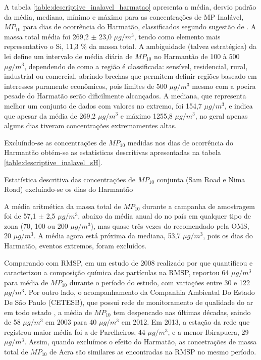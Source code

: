 A tabela \ref{table:descriptive_inalavel_harmatao} apresenta a média, 
desvio padrão da média, mediana, mínimo e máximo para as concentrações de 
MP Inalável, $MP_{10}$ para dias de ocorrência do Harmatão, classificados
segundo sugestão de \citet{aboh2009}. A massa total média foi 269,2 $\pm$ 23,0
$\mu g/ m^3$, tendo como elemento mais representativo o Si, 11,3 \% da massa total. 
A ambiguidade (talvez estratégica) da lei define um intervalo de média diária 
de $MP_{10}$ no Harmantão de 100 à 500 $\mu g/ m^3$, dependendo de como a região
é classificada: sensível, residencial, rural, industrial ou comercial, abrindo
brechas que permitem definir regiões baseado em interesses puramente econômicos,
pois limites de 500 $\mu g/ m^3$ mesmo com a poeira pesade do Harmatão serão
dificilmente alcançados. A mediana, que representa melhor um conjunto de dados
com valores no extremo, foi 154,7 $\mu g/ m^3$, e indica que apesar da média 
de 269,2 $\mu g/ m^3$ e máximo 1255,8 $\mu g/ m^3$, no geral apenas alguns
dias tiveram concentrações extremamentes altas. 

Excluíndo-se as concentrações de $MP_{10}$ medidas nos dias de 
ocorrência do Harmantão obtém-se as estatísticas descritivas apresentadas na 
tabela \ref{table:descriptive_inalavel_sH}.

\begin{table}[H]
  \centering
    
  \caption{Estatística descritiva das concentrações de $MP_{10}$ conjunta 
           (Sam Road e Nima Road) excluíndo-se os dias do Harmantão
            \label{table:descriptive_inalavel_sH}}
\end{table}

A média aritmética da massa total de $MP_{10}$ durante a campanha de amostragem 
foi de 57,1 $\pm$ 2,5 $\mu g/ m^3$, abaixo da média 
anual do no país em qualquer tipo de zona (70, 100 ou 200 $\mu g/ m^3$), 
mas quase três vezes do recomendado pela OMS, 20 $\mu g/m^3$.
A média agora está próxima da mediana, 53,7 $\mu g/ m^3$, 
pois os dias do Harmatão, eventos extremos, foram excluídos. 

Comparando com RMSP, em um estudo de 2008 realizado por \citet{souza2014}
que quantificou e caracterizou a composição química das partículas na RMSP,
reportou 64 $\mu g / m^3$ para média de $MP_{10}$ durante o período do estudo, 
com variações entre 30 e 122 $\mu g / m^3$. Por outro lado, o acompanhamento 
da Companhia Ambiental Do Estado De São Paulo (CETESB), que possui 
rede de monitoramento de qualidade do ar em todo estado \citep{cetesb2014}, 
a média de $MP_{10}$ tem despencado nas últimas décadas, saindo de 58 
$\mu g / m^3$ em 2003 para 40 $\mu g / m^3$ em 2012. Em 2013, a estação da rede
que registrou maior média foi a de Parelheiros, 44 $\mu g / m^3$, e a menor 
Ibirapuera, 29 $\mu g / m^3$. Assim, quando excluímos o efeito do Harmatão, 
as concetrações de massa total de $MP_{10}$ de Acra são similares as encontradas
na RMSP no mesmo período.

